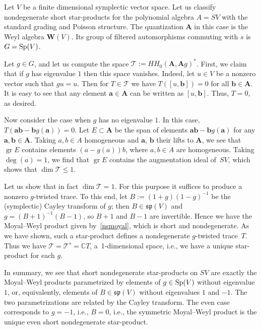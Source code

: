 \documentclass[pdftex]{sigma}
\numberwithin{equation}{section}
\begin{document}
\begin{Example}\label{repth1} Let $V$ be a finite dimensional symplectic vector space. Let us classify nondegenerate short star-products for the polynomial algebra $A=SV$ with the standard grading and Poisson structure. The quantization ${{\mathbf A}}$ in this case is the Weyl algebra ${\mathbf{W}}(V)$. Its group of filtered automorphisms commuting with $s$ is $G={\rm Sp}(V)$.

Let $g\in G$, and let us compute the space ${\mathcal T}:=HH_0({{\mathbf A}},{{\mathbf A}}g)^*$. First, we claim that if $g$ has eigenvalue $1$ then this space vanishes. Indeed, let $u\in V$ be a nonzero vector such that $g u=u$. Then for $T\in {\mathcal T}$ we have $T([u,{\mathbf b}])=0$ for all ${\mathbf b}\in {\mathbf A}$. It is easy to see that any element ${\mathbf a}\in {{\mathbf A}}$ can be written as $[u,{\mathbf b}]$. Thus, $T=0$, as desired.

Now consider the case when $g$ has no eigenvalue $1$. In this case, $T({\mathbf{ab}}-{\mathbf b}g({\mathbf a}))=0$. Let $E\subset {{\mathbf A}}$ be the span of elements ${\mathbf{ab}}-{\mathbf b}g({\mathbf a})$ for any ${\mathbf a},{\mathbf b}\in {\mathbf A}$. Taking $a,b\in A$ homogeneous and ${\mathbf a}$, ${\mathbf b}$ their lifts to ${\mathbf A}$, we see that $\operatorname{gr}E$ contains elements $(a-g(a))b$, where $a,b\in A$ are homogeneous. Taking $\deg(a)=1$, we find that $\operatorname{gr}E$ contains the augmentation ideal of~$SV$, which shows that $\dim {\mathcal T}\le 1$.

Let us show that in fact $\dim {\mathcal T}=1$. For this purpose it suffices to produce a nonzero $g$-twisted trace. To this end, let $B:=(1+g)(1-g)^{-1}$ be the (symplectic) Cayley transform of $g$; then $B\in {\mathfrak{sp}}(V)$ and $g=(B+1)^{-1}(B-1)$, so $B+1$ and $B-1$ are invertible. Hence we have the
Moyal--Weyl product given by~\eqref{nsmoyal}, which is short and nondegenerate. As we have shown, such a star-product defines a nondegenerate $g$-twisted trace~$T$. Thus we have $\mathcal{T}=\mathcal{T}^s={\mathbb C}T$, a~1-dimensional space, i.e., we have a unique star-product for each $g$.

In summary, we see that short nondegenerate star-products on $SV$ are exactly the Moyal--Weyl products parametrized by elements of $g\in {\rm Sp}(V)$ without eigenvalue $1$, or, equivalently, elements of $B\in {\mathfrak{sp}}(V)$ without eigenvalues $1$ and $-1$. The two parametrizations are related by the Cayley transform. The even case corresponds to $g=-1$, i.e., $B=0$, i.e., the symmetric Moyal--Weyl product is the unique even short nondegenerate star-product.


\end{Example}
\end{document}
